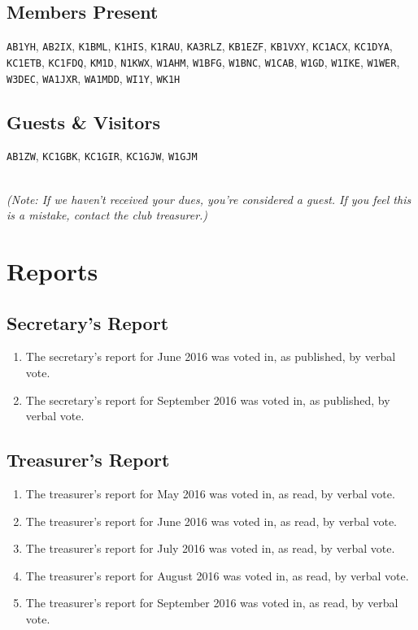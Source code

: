 \documentclass[10pt,letterpaper]{article}
\begin{document}
\subsection{Members Present}
\texttt{AB1YH}, \texttt{AB2IX}, \texttt{K1BML}, \texttt{K1HIS}, \texttt{K1RAU}, \texttt{KA3RLZ}, \texttt{KB1EZF}, \texttt{KB1VXY}, \texttt{KC1ACX}, \texttt{KC1DYA}, \texttt{KC1ETB}, \texttt{KC1FDQ},  \texttt{KM1D}, \texttt{N1KWX}, \texttt{W1AHM}, \texttt{W1BFG}, \texttt{W1BNC}, \texttt{W1CAB}, \texttt{W1GD}, \texttt{W1IKE}, \texttt{W1WER}, \texttt{W3DEC}, \texttt{WA1JXR}, \texttt{WA1MDD}, \texttt{WI1Y}, \texttt{WK1H}

\subsection{Guests \& Visitors}

\texttt{AB1ZW}, \texttt{KC1GBK}, \texttt{KC1GIR}, \texttt{KC1GJW}, \texttt{W1GJM}

\noindent\\
\emph{(Note: If we haven't received your dues, you're considered a guest. If you feel this is a mistake, contact the club treasurer.)}

\section{Reports}

\subsection{Secretary's Report}

\begin{enumerate}
\item The secretary's report for June 2016 was voted in, as published, by verbal vote.
\item The secretary's report for September 2016 was voted in, as published, by verbal vote.
\end{enumerate}

\newpage
\subsection{Treasurer's Report}

\begin{enumerate}
\item The treasurer's report for May 2016 was voted in, as read, by verbal vote.
\item The treasurer's report for June 2016 was voted in, as read, by verbal vote.
\item The treasurer's report for July 2016 was voted in, as read, by verbal vote.
\item The treasurer's report for August 2016 was voted in, as read, by verbal vote.
\item The treasurer's report for September 2016 was voted in, as read, by verbal vote.
\end{enumerate}
\end{document}

